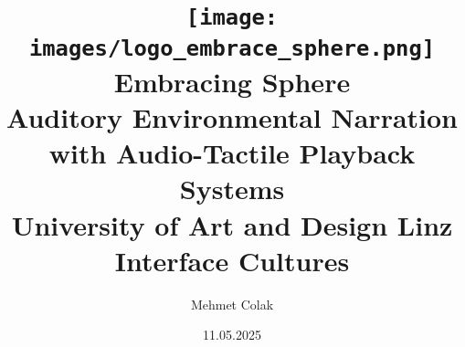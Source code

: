 \begin{titlepage}
  
    \author{Mehmet Colak}
    \title{\texttt{[image: images/logo\_embrace\_sphere.png]}\\[5ex]  Embracing Sphere\\[1ex] 
    \Large Auditory Environmental Narration with Audio-Tactile Playback Systems\\[4ex]
    \large University of Art and Design Linz\\[0.5ex]
    Interface Cultures\\[6ex]}
    \date{11.05.2025}

\end{titlepage}

\maketitle